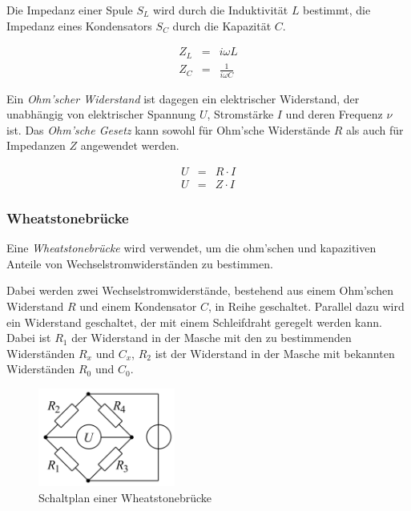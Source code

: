 \documentclass[12pt,a4paper]{scrartcl}
\numberwithin{equation}{section} %
\begin{document}
Die Impedanz einer Spule $S_L$ wird durch die Induktivität $L$ bestimmt, die Impedanz eines Kondensators $S_C$ durch die Kapazität $C$.

\begin{eqnarray}
    Z_L &=& i\omega L \\
    Z_C &=& \frac{1}{i\omega C}
\end{eqnarray}

\noindent
Ein \emph{Ohm'scher Widerstand} ist dagegen ein elektrischer Widerstand, der unabhängig von elektrischer Spannung $U$, Stromstärke $I$ und deren Frequenz $\nu$ ist. Das \emph{Ohm'sche Gesetz} kann sowohl für Ohm'sche Widerstände $R$ als auch für Impedanzen $Z$ angewendet werden.

\begin{eqnarray}
    U &=& R\cdot I \\
    U &=& Z\cdot I
\end{eqnarray}

\hypertarget{wheatstonebruxfccke}{%
\subsubsection{Wheatstonebrücke}\label{wheatstonebruxfccke}}

Eine \emph{Wheatstonebrücke} wird verwendet, um die ohm'schen und kapazitiven Anteile von Wechselstromwiderständen zu bestimmen.

Dabei werden zwei Wechselstromwiderstände, bestehend aus einem Ohm'schen Widerstand $R$ und einem Kondensator $C$, in Reihe geschaltet. Parallel dazu wird ein Widerstand geschaltet, der mit einem Schleifdraht geregelt werden kann. Dabei ist $R_1$ der Widerstand in der Masche mit den zu bestimmenden Widerständen $R_x$ und $C_x$, $R_2$ ist der Widerstand in der Masche mit bekannten Widerständen $R_0$ und $C_0$.

\begin{figure}[h!]
	\centering
	\includegraphics[width=0.4\textwidth]{../media/B1.5/WhBr_Diagonalbild.png}
	\caption{Schaltplan einer Wheatstonebrücke \cite{File:WhBr_Diagonalbild}}
\end{figure}
\end{document}
